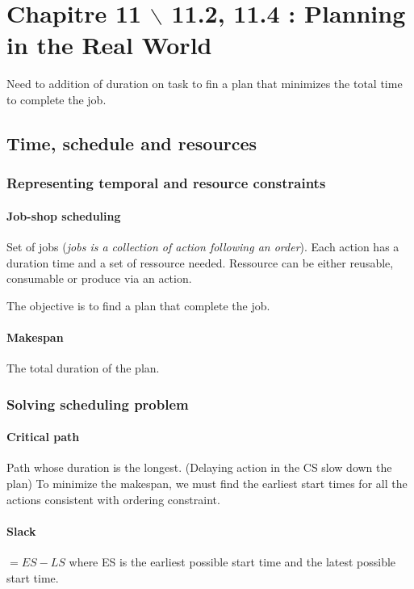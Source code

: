 \section{Chapitre 11 $\backslash$ 11.2, 11.4 : Planning in the Real World}

Need to addition  of duration on task  to fin a plan  that minimizes the
total time to complete the job.

\subsection{Time, schedule and resources}

\subsubsection{Representing temporal and resource constraints}

\paragraph{Job-shop scheduling} 

Set  of  jobs (\textit{jobs  is  a  collection  of action  following  an
order}). Each action has a duration  time and a set of ressource needed.
Ressource can  be either reusable,  consumable or produce via  an action.

The objective is to find a plan that complete the job.

\paragraph{Makespan} The total duration of the plan.

\subsubsection{Solving scheduling problem}

\paragraph{Critical path} Path whose  duration is the longest. (Delaying
action in the CS  slow down the plan) To minimize  the makespan, we must
find  the earliest  start  times  for all  the  actions consistent  with
ordering constraint.

\paragraph{Slack} $= ES - LS$ where ES is the earliest  possible start time
and the latest possible start time.

